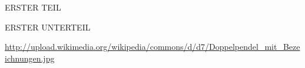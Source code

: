 \documentclass[pdftex, a4paper,11pt, twoside]{report}
\begin{document}
  \begin{appendix}
    \label{Anhang}
    
    
    
    \begin{chapter}{ERSTER TEIL}
      \label{Anhang:chp:ERSTERTEIL}
      
      
      
      \begin{section}{ERSTER UNTERTEIL}
	\label{Anhang:chp:ERSTERTEIL:sec:UNTERTEIL}
       
       
       
      \end{section}
      
      
    \end{chapter}
    
  \end{appendix}
  
  
  
  \begin{thebibliography}{99}
    \scriptsize
    \url{http://upload.wikimedia.org/wikipedia/commons/d/d7/Doppelpendel_mit_Bezeichnungen.jpg}
    
  \end{thebibliography}
  
\end{document}
